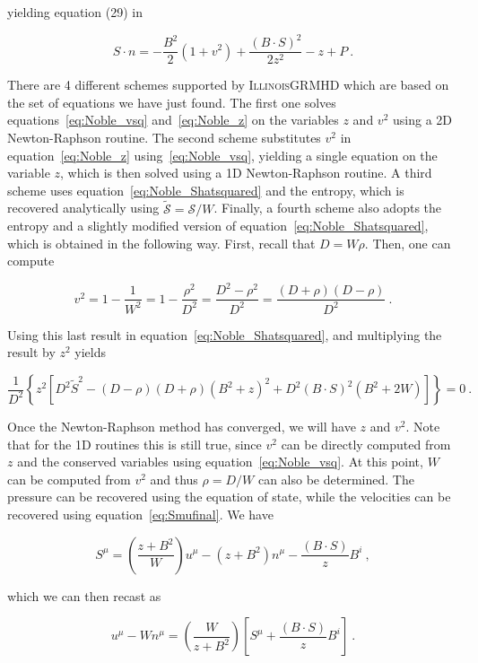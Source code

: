 \documentclass{article}
\newcommand{\igm}{\textsc{IllinoisGRMHD}\xspace}
\newcommand{\BdotS}{B\cdot S}
\newcommand{\Sdotn}{S\cdot n}
\newcommand{\ent}{\mathcal{S}}
\newcommand{\entstar}{\tilde{\ent}}
\newcommand{\eq}[1]{
\begin{equation}
    #1
\end{equation}
}
\begin{document}
\noindent yielding equation (29) in~\cite{noble2006primitive}

\eq{
\boxed{ \Sdotn = -\frac{B^{2}}{2}\left(1+v^{2}\right) + \frac{\left(\BdotS\right)^{2}}{2z^{2}} - z + P }\ .\label{eq:Noble_z}
}

There are 4 different schemes supported by \igm which are based on the set of equations we have just found. The first one solves equations~\eqref{eq:Noble_vsq} and~\eqref{eq:Noble_z} on the variables $z$ and $v^{2}$ using a 2D Newton-Raphson routine. The second scheme substitutes $v^{2}$ in equation~\eqref{eq:Noble_z} using~\eqref{eq:Noble_vsq}, yielding a single equation on the variable $z$, which is then solved using a 1D Newton-Raphson routine. A third scheme uses equation~\eqref{eq:Noble_Shatsquared} and the entropy, which is recovered analytically using $\entstar = \ent/W$. Finally, a fourth scheme also adopts the entropy and a slightly modified version of equation~\eqref{eq:Noble_Shatsquared}, which is obtained in the following way. First, recall that $D = W \rho$. Then, one can compute

\eq{
  v^{2} = 1 - \frac{1}{W^{2}} = 1 - \frac{\rho^{2}}{D^{2}} = \frac{D^{2}-\rho^{2}}{D^{2}} = \frac{\left(D+\rho\right)\left(D-\rho\right)}{D^{2}}\ .
}

\noindent Using this last result in equation~\eqref{eq:Noble_Shatsquared}, and multiplying the result by $z^{2}$ yields

\eq{
  \boxed{\frac{1}{D^{2}}\left\{z^{2}\left[D^{2}\tilde{S}^{2} - \left(D-\rho\right)\left(D+\rho\right)\left(B^{2}+z\right)^{2} + D^{2}\left(\BdotS\right)^{2}\left(B^{2}+2W\right)\right]\right\} = 0}\ .
}

Once the Newton-Raphson method has converged, we will have $z$ and $v^{2}$. Note that for the 1D routines this is still true, since $v^{2}$ can be directly computed from $z$ and the conserved variables using equation~\eqref{eq:Noble_vsq}. At this point, $W$ can be computed from $v^{2}$ and thus $\rho = D/W$ can also be determined. The pressure can be recovered using the equation of state, while the velocities can be recovered using equation~\eqref{eq:Smufinal}. We have

\eq{
  S^{\mu} = \left(\frac{z+B^{2}}{W}\right)u^{\mu} - \left(z+B^{2}\right)n^{\mu} - \frac{\left(\BdotS\right)}{z}B^{i}\ ,
}

\noindent which we can then recast as

\eq{
  u^{\mu} - Wn^{\mu}= \left(\frac{W}{z+B^{2}}\right)\left[S^{\mu}+\frac{\left(\BdotS\right)}{z}B^{i}\right]\ .
}
\end{document}
